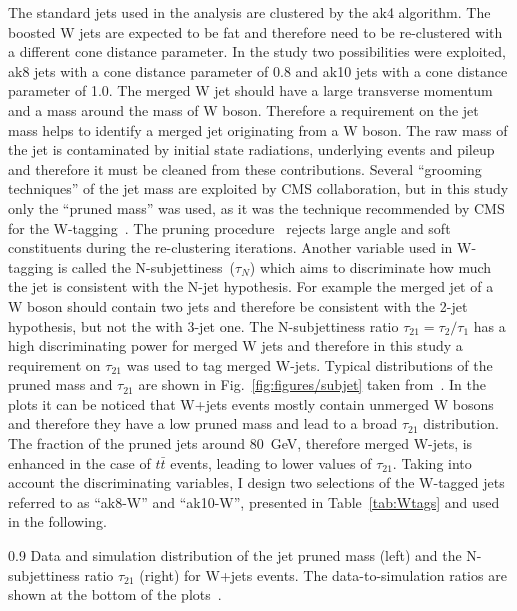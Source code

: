 The standard jets used in the analysis are clustered by the ak4 algorithm. The boosted W jets are expected to be fat and therefore need to be re-clustered with a different cone distance parameter. In the study two possibilities were exploited, ak8 jets with a cone distance parameter  of 0.8 and ak10 jets with a cone distance parameter of 1.0. The merged W jet should have a large transverse momentum and a mass around the mass of W boson. Therefore a requirement on the jet mass helps to identify a merged jet originating from a W boson. The raw mass of the jet is contaminated by initial state radiations, underlying events and pileup and therefore it must be cleaned from these contributions. Several ``grooming techniques'' of the jet mass are exploited by CMS collaboration, but in this study only the ``pruned mass'' was used, as it was the technique recommended by CMS for the W-tagging~\cite{website:Wtagging}. The pruning procedure~\cite{Ellis:2009su} rejects large angle and soft constituents during the re-clustering iterations. Another variable used in W-tagging is called the N-subjettiness~($\tau_{N}$) which aims to discriminate how much the jet is consistent with the N-jet hypothesis. For example the merged jet of a W boson should contain two jets and therefore be consistent with the 2-jet hypothesis, but  not the with 3-jet one. The N-subjettiness ratio $\tau_{21} = \tau_{2}/\tau_{1}$ has a high discriminating power for merged W jets and therefore in this study a requirement on $\tau_{21}$ was used to tag merged W-jets. Typical distributions of the pruned mass and  $\tau_{21}$ are shown in Fig.~\ref{fig:figures/subjet} taken from~\cite{Khachatryan:2014vla}. In the plots it can be noticed that  W+jets events mostly contain unmerged W bosons and therefore they have a low pruned mass and lead to a broad $\tau_{21}$ distribution. The fraction of the pruned jets around 80~GeV, therefore merged W-jets, is enhanced in the case of $t\bar{t}$ events, leading to lower values of $\tau_{21}$. Taking into account the discriminating variables, I design two selections of the W-tagged jets referred to as ``ak8-W'' and ``ak10-W'', presented in Table~\ref{tab:Wtags} and used in the following.


                 {0.9}       %
                 {Data and simulation distribution of the jet pruned mass (left) and the N-subjettiness ratio $\tau_{21}$ (right) for W+jets events. The data-to-simulation ratios are shown at the bottom of the plots~\cite{Khachatryan:2014vla}.}

